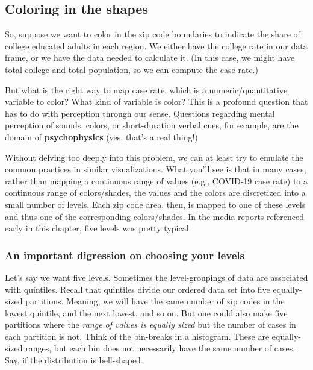 \documentclass[
  openany]{book}
\begin{document}
\hypertarget{coloring-in-the-shapes}{%
\subsection*{Coloring in the shapes}\label{coloring-in-the-shapes}}

So, suppose we want to color in the zip code boundaries to indicate the share of college educated adults in each region. We either have the college rate in our data frame, or we have the data needed to calculate it. (In this case, we might have total college and total population, so we can compute the case rate.)

But what is the right way to map case rate, which is a numeric/quantitative variable to color? What kind of variable is color? This is a profound question that has to do with perception through our sense. Questions regarding mental perception of sounds, colors, or short-duration verbal cues, for example, are the domain of \textbf{psychophysics} (yes, that's a real thing!)

Without delving too deeply into this problem, we can at least try to emulate the common practices in similar visualizations. What you'll see is that in many cases, rather than mapping a continuous range of values (e.g., COVID-19 case rate) to a continuous range of colors/shades, the values and the colors are discretized into a small number of levels. Each zip code area, then, is mapped to one of these levels and thus one of the corresponding colors/shades. In the media reports referenced early in this chapter, five levels was pretty typical.

\hypertarget{an-important-digression-on-choosing-your-levels}{%
\subsubsection*{An important digression on choosing your levels}\label{an-important-digression-on-choosing-your-levels}}

Let's say we want five levels. Sometimes the level-groupings of data are associated with quintiles. Recall that quintiles divide our ordered data set into five equally-sized partitions. Meaning, we will have the same number of zip codes in the lowest quintile, and the next lowest, and so on. But one could also make five partitions where the \emph{range of values is equally sized} but the number of cases in each partition is not. Think of the bin-breaks in a histogram. These are equally-sized ranges, but each bin does not necessarily have the same number of cases. Say, if the distribution is bell-shaped.
\end{document}

